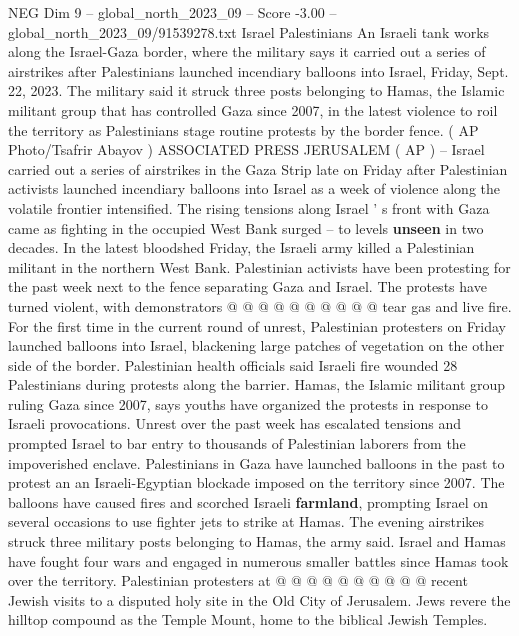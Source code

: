 \begin{textsample}{NEG Dim 9 – global\_north\_2023\_09 – Score -3.00 – global\_north\_2023\_09/91539278.txt}  \label{ex:f9_neg_036}
Israel Palestinians An Israeli tank works along the Israel-Gaza border, where the military says it carried out a series of airstrikes after Palestinians launched incendiary balloons into Israel, Friday, Sept. 22, 2023.
The military said it struck three posts belonging to Hamas, the Islamic militant group that has controlled Gaza since 2007, in the latest violence to roil the territory as Palestinians stage routine protests by the border fence. ( AP Photo/Tsafrir Abayov ) ASSOCIATED PRESS JERUSALEM ( AP ) -- Israel carried out a series of airstrikes in the Gaza Strip late on Friday after Palestinian activists launched incendiary balloons into Israel as a week of violence along the volatile frontier intensified.
The rising tensions along Israel ' s front with Gaza came as fighting in the occupied West Bank surged -- to levels \textbf{unseen} in two decades.
In the latest bloodshed Friday, the Israeli army killed a Palestinian militant in the northern West Bank.
Palestinian activists have been protesting for the past week next to the fence separating Gaza and Israel.
The protests have turned violent, with demonstrators @ @ @ @ @ @ @ @ @ @ tear gas and live fire.
For the first time in the current round of unrest, Palestinian protesters on Friday launched balloons into Israel, blackening large patches of vegetation on the other side of the border.
Palestinian health officials said Israeli fire wounded 28 Palestinians during protests along the barrier.
Hamas, the Islamic militant group ruling Gaza since 2007, says youths have organized the protests in response to Israeli provocations.
Unrest over the past week has escalated tensions and prompted Israel to bar entry to thousands of Palestinian laborers from the impoverished enclave.
Palestinians in Gaza have launched balloons in the past to protest an an Israeli-Egyptian blockade imposed on the territory since 2007.
The balloons have caused fires and scorched Israeli \textbf{farmland}, prompting Israel on several occasions to use fighter jets to strike at Hamas.
The evening airstrikes struck three military posts belonging to Hamas, the army said.
Israel and Hamas have fought four wars and engaged in numerous smaller battles since Hamas took over the territory.
Palestinian protesters at @ @ @ @ @ @ @ @ @ @ recent Jewish visits to a disputed holy site in the Old City of Jerusalem.
Jews revere the hilltop compound as the Temple Mount, home to the biblical Jewish Temples.

\end{textsample}

